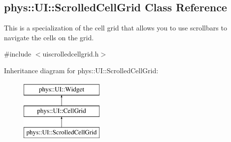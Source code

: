 \hypertarget{classphys_1_1UI_1_1ScrolledCellGrid}{
\subsection{phys::UI::ScrolledCellGrid Class Reference}
\label{d5/db4/classphys_1_1UI_1_1ScrolledCellGrid}
}


This is a specialization of the cell grid that allows you to use scrollbars to navigate the cells on the grid.  




{\ttfamily \#include $<$uiscrolledcellgrid.h$>$}

Inheritance diagram for phys::UI::ScrolledCellGrid:\begin{figure}[H]
\begin{center}
\leavevmode
\includegraphics[height=3.000000cm]{d5/db4/classphys_1_1UI_1_1ScrolledCellGrid}
\end{center}
\end{figure}
